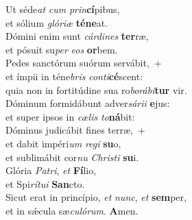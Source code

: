 \evenverse Ut séde\textit{at} \textit{cum} \textit{prin}\textbf{cí}pibus,~\*\\
\evenverse et sólium \textit{gló}\textit{ri}\textit{æ} \textbf{té}\textbf{ne}at.\\
\oddverse Dómini enim sunt \textit{cár}\textit{di}\textit{nes} \textbf{ter}ræ,~\*\\
\oddverse et pósuit su\textit{per} \textit{e}\textit{os} \textbf{or}bem.\\
\evenverse Pedes sanctórum suórum servábit,~+\\
\evenverse  et ímpii in téne\textit{bris} \textit{con}\textit{ti}\textbf{cé}scent:~\*\\
\evenverse quia non in fortitúdine sua ro\textit{bo}\textit{rá}\textit{bi}\textbf{tur} vir.\\
\oddverse Dóminum formidábunt adver\textit{sá}\textit{ri}\textit{i} \textbf{e}jus:~\*\\
\oddverse et super ipsos in \textit{cæ}\textit{lis} \textit{to}\textbf{ná}bit:\\
\evenverse Dóminus judicábit fines terræ,~+\\
\evenverse  et dabit impéri\textit{um} \textit{re}\textit{gi} \textbf{su}o,~\*\\
\evenverse et sublimábit cor\textit{nu} \textit{Chri}\textit{sti} \textbf{su}i.\\
\oddverse Glória \textit{Pa}\textit{tri}, \textit{et} \textbf{Fí}lio,~\*\\
\oddverse et Spi\textit{rí}\textit{tu}\textit{i} \textbf{San}cto.\\
\evenverse Sicut erat in princípio, \textit{et} \textit{nunc}, \textit{et} \textbf{sem}per,~\*\\
\evenverse et in sǽcula sæ\textit{cu}\textit{ló}\textit{rum}. \textbf{A}men.\\

